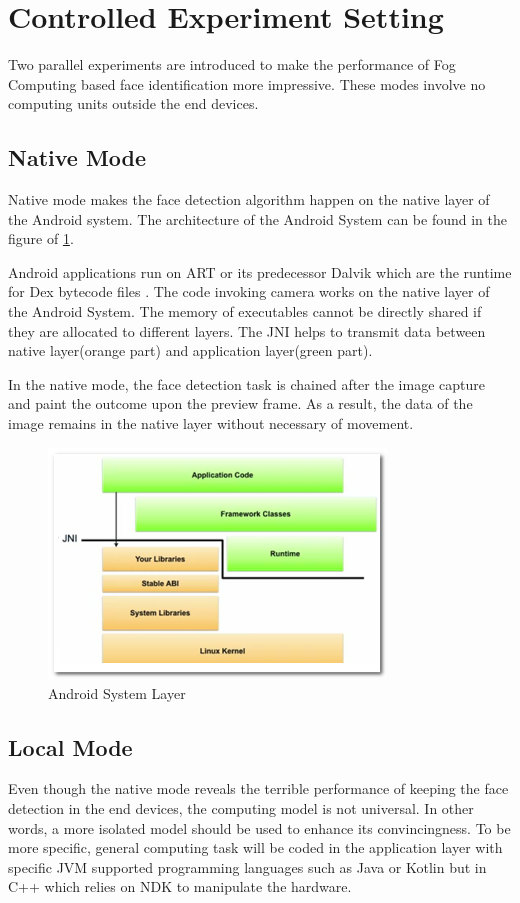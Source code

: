 \section{Controlled Experiment Setting}
Two parallel experiments are introduced to make the performance of Fog Computing based face identification more impressive. These modes involve no computing units outside the end devices.

\subsection{Native Mode}
Native mode makes the face detection algorithm happen on the native layer of the Android system. The architecture of the Android System can be found in the figure of \ref{fig:android_application_layer}.

Android applications run on ART or its predecessor Dalvik which are the runtime for Dex bytecode files \cite{android-art}. The code invoking camera works on the native layer of the Android System. The memory of executables cannot be directly shared if they are allocated to different layers. The JNI helps to transmit data between native layer(orange part) and application layer(green part).

In the native mode, the face detection task is chained after the image capture and paint the outcome upon the preview frame. As a result, the data of the image remains in the native layer without necessary of movement.


\begin{figure}
    \centering
    \includegraphics[width=0.8\textwidth]{images/jni.jpg}
    \caption{Android System Layer}
    \label{fig:android_application_layer}
\end{figure}

\subsection{Local Mode}
Even though the native mode reveals the terrible performance of keeping the face detection in the end devices, the computing model is not universal. In other words, a more isolated model should be used to enhance its convincingness. To be more specific, general computing task will be coded in the application layer with specific JVM supported programming languages such as Java or Kotlin but in C++ which relies on NDK to manipulate the hardware. 


